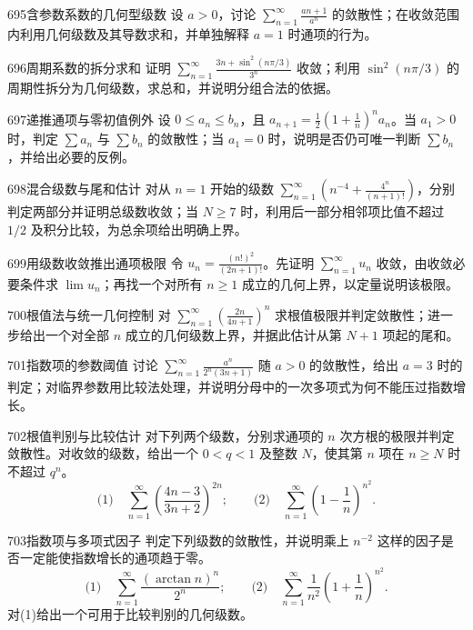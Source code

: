 \begin{exercise}{695}{含参数系数的几何型级数}
设 $a>0$，讨论 $\sum_{n=1}^{\infty}\frac{an+1}{a^n}$ 的敛散性；在收敛范围内利用几何级数及其导数求和，并单独解释 $a=1$ 时通项的行为。
\end{exercise}
\begin{exercise}{696}{周期系数的拆分求和}
证明 $\sum_{n=1}^{\infty}\frac{3n+\sin^2(n\pi/3)}{3^n}$ 收敛；利用 $\sin^2(n\pi/3)$ 的周期性拆分为几何级数，求总和，并说明分组合法的依据。
\end{exercise}
\begin{exercise}{697}{递推通项与零初值例外}
设 $0\le a_n\le b_n$，且 $a_{n+1}=\frac12(1+\frac1n)^n a_n$。当 $a_1>0$ 时，判定 $\sum a_n$ 与 $\sum b_n$ 的敛散性；当 $a_1=0$ 时，说明是否仍可唯一判断 $\sum b_n$，并给出必要的反例。
\end{exercise}
\begin{exercise}{698}{混合级数与尾和估计}
对从 $n=1$ 开始的级数 $\sum_{n=1}^{\infty}(n^{-4}+\frac{4^n}{(n+1)!})$，分别判定两部分并证明总级数收敛；当 $N\ge7$ 时，利用后一部分相邻项比值不超过 $1/2$ 及积分比较，为总余项给出明确上界。
\end{exercise}
\begin{exercise}{699}{用级数收敛推出通项极限}
令 $u_n=\frac{(n!)^2}{(2n+1)!}$。先证明 $\sum_{n=1}^{\infty}u_n$ 收敛，由收敛必要条件求 $\lim u_n$；再找一个对所有 $n\ge1$ 成立的几何上界，以定量说明该极限。
\end{exercise}
\begin{exercise}{700}{根值法与统一几何控制}
对 $\sum_{n=1}^{\infty}(\frac{2n}{4n+1})^n$ 求根值极限并判定敛散性；进一步给出一个对全部 $n$ 成立的几何级数上界，并据此估计从第 $N+1$ 项起的尾和。
\end{exercise}
\begin{exercise}{701}{指数项的参数阈值}
讨论 $\sum_{n=1}^{\infty}\frac{a^n}{2^n(3n+1)}$ 随 $a>0$ 的敛散性，给出 $a=3$ 时的判定；对临界参数用比较法处理，并说明分母中的一次多项式为何不能压过指数增长。
\end{exercise}
\begin{exercise}{702}{根值判别与比较估计}
对下列两个级数，分别求通项的 $n$ 次方根的极限并判定敛散性。对收敛的级数，给出一个 $0<q<1$ 及整数 $N$，使其第 $n$ 项在 $n\ge N$ 时不超过 $q^n$。
\[\text{(1)}\quad\sum_{n=1}^{\infty}\left(\frac{4n-3}{3n+2}\right)^{2n};\qquad
\text{(2)}\quad\sum_{n=1}^{\infty}\left(1-\frac1n\right)^{n^2}.\]
\end{exercise}
\begin{exercise}{703}{指数项与多项式因子}
判定下列级数的敛散性，并说明乘上 $n^{-2}$ 这样的因子是否一定能使指数增长的通项趋于零。
\[\text{(1)}\quad\sum_{n=1}^{\infty}\frac{(\arctan n)^n}{2^n};\qquad
\text{(2)}\quad\sum_{n=1}^{\infty}\frac1{n^2}\left(1+\frac1n\right)^{n^2}.\]
对(1)给出一个可用于比较判别的几何级数。
\end{exercise}
